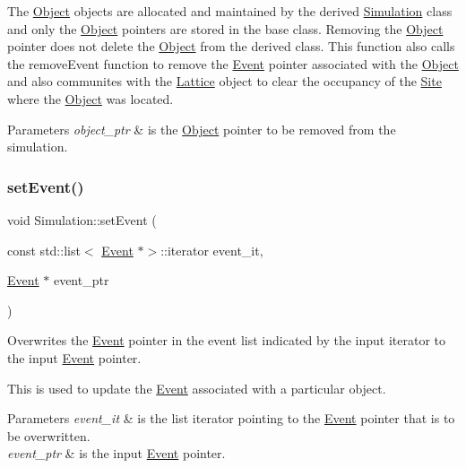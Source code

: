 The \hyperlink{class_object}{Object} objects are allocated and maintained by the derived \hyperlink{class_simulation}{Simulation} class and only the \hyperlink{class_object}{Object} pointers are stored in the base class. Removing the \hyperlink{class_object}{Object} pointer does not delete the \hyperlink{class_object}{Object} from the derived class. This function also calls the remove\+Event function to remove the \hyperlink{class_event}{Event} pointer associated with the \hyperlink{class_object}{Object} and also communites with the \hyperlink{class_lattice}{Lattice} object to clear the occupancy of the \hyperlink{class_site}{Site} where the \hyperlink{class_object}{Object} was located. 
\begin{DoxyParams}{Parameters}
{\em object\+\_\+ptr} & is the \hyperlink{class_object}{Object} pointer to be removed from the simulation. \\
\hline
\end{DoxyParams}
\mbox{\label{class_simulation_a4490fc0d8bb8a36b0ff581148ab85a14}} 
\subsubsection{\texorpdfstring{set\+Event()}{setEvent()}}
{\footnotesize\ttfamily void Simulation\+::set\+Event (\begin{DoxyParamCaption}\item[{const std\+::list$<$ \hyperlink{class_event}{Event} $\ast$$>$\+::iterator}]{event\+\_\+it,  }\item[{\hyperlink{class_event}{Event} $\ast$}]{event\+\_\+ptr }\end{DoxyParamCaption})\hspace{0.3cm}{\ttfamily [protected]}}



Overwrites the \hyperlink{class_event}{Event} pointer in the event list indicated by the input iterator to the input \hyperlink{class_event}{Event} pointer. 

This is used to update the \hyperlink{class_event}{Event} associated with a particular object. 
\begin{DoxyParams}{Parameters}
{\em event\+\_\+it} & is the list iterator pointing to the \hyperlink{class_event}{Event} pointer that is to be overwritten. \\
\hline
{\em event\+\_\+ptr} & is the input \hyperlink{class_event}{Event} pointer. \\
\hline
\end{DoxyParams}
\mbox{\label{class_simulation_a1a825b9da67da43104137662694655bd}} 
